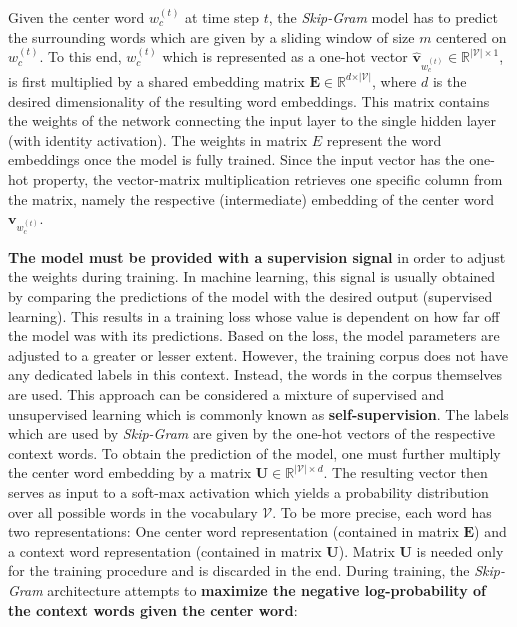 

Given the center word $w_c^{(t)}$ at time step $t$, the \textit{Skip-Gram} model has to predict the surrounding words which are given by a sliding window of size $m$ centered on $w_c^{(t)}$. To this end, $w_c^{(t)}$ which is represented as a one-hot vector $\bm{\widehat{v}}_{w_c^{(t)}} \in \mathbb{R}^{\vert \mathcal{V} \vert \times 1}$, is first multiplied by a shared embedding matrix $\bm{E} \in \mathbb{R}^{d \times \vert \mathcal{V} \vert}$, where $d$ is the desired dimensionality of the resulting word embeddings. This matrix contains the weights of the network connecting the input layer to the single hidden layer (with identity activation). The weights in matrix $E$ represent the word embeddings once the model is fully trained. Since the input vector has the one-hot property, the vector-matrix multiplication retrieves one specific column from the matrix, namely the respective (intermediate) embedding of the center word $\bm{v}_{w_c^{(t)}}$.

\textbf{The model must be provided with a supervision signal} in order to adjust the weights during training. In machine learning, this signal is usually obtained by comparing the predictions of the model with the desired output (supervised learning). This results in a training loss whose value is dependent on how far off the model was with its predictions. Based on the loss, the model parameters are adjusted to a greater or lesser extent. However, the training corpus does not have any dedicated labels in this context. Instead, the words in the corpus themselves are used. This approach can be considered a mixture of supervised and unsupervised learning which is commonly known as \textbf{self-supervision}. The labels which are used by \textit{Skip-Gram} are given by the one-hot vectors of the respective context words. To obtain the prediction of the model, one must further multiply the center word embedding by a matrix $\bm{U} \in \mathbb{R}^{\vert \mathcal{V} \vert \times d}$. The resulting vector then serves as input to a soft-max activation which yields a probability distribution over all possible words in the vocabulary $\mathcal{V}$. To be more precise, each word has two representations: One center word representation (contained in matrix $\bm{E}$) and a context word representation (contained in matrix $\bm{U}$). Matrix $\bm{U}$ is needed only for the training procedure and is discarded in the end. During training, the \textit{Skip-Gram} architecture attempts to \textbf{maximize the negative log-probability of the context words given the center word}:

